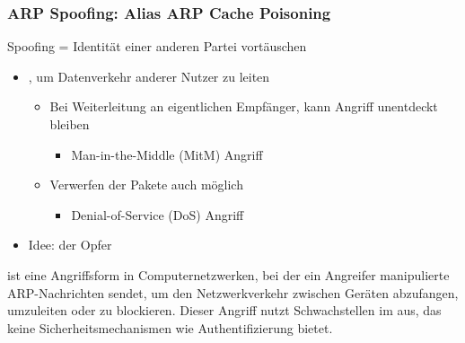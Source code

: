 \subsubsection*{ARP Spoofing: Alias ARP Cache Poisoning}
Spoofing = Identität einer anderen Partei vortäuschen
\begin{itemize}
    \item {}, um Datenverkehr anderer Nutzer  zu leiten
    \begin{itemize}
        \item Bei Weiterleitung an eigentlichen Empfänger, kann Angriff unentdeckt bleiben
        \begin{itemize}
            \item Man-in-the-Middle (MitM) Angriff
        \end{itemize}
        \item Verwerfen der Pakete auch möglich
        \begin{itemize}
            \item Denial-of-Service (DoS) Angriff
        \end{itemize}
    \end{itemize}
    \item Idee:  der Opfer
\end{itemize}
\begin{infoBox}
     ist eine Angriffsform in Computernetzwerken, bei der ein Angreifer manipulierte ARP-Nachrichten sendet, um den Netzwerkverkehr zwischen Geräten abzufangen, umzuleiten oder zu blockieren. Dieser Angriff nutzt Schwachstellen im  aus, das keine Sicherheitsmechanismen wie Authentifizierung bietet.
\end{infoBox}
